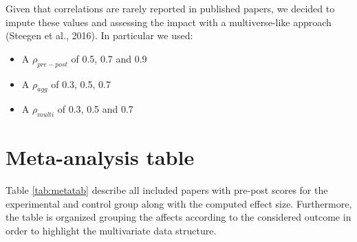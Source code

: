 \documentclass[
]{article}
\providecommand{\tightlist}{%
  \setlength{\itemsep}{0pt}\setlength{\parskip}{0pt}}
\begin{document}
Given that correlations are rarely reported in published papers, we decided to impute these values and assessing the impact with a multiverse-like approach (Steegen et al., 2016). In particular we used:

\begin{itemize}
\tightlist
\item
  A \(\rho_{pre-post}\) of 0.5, 0.7 and 0.9
\item
  A \(\rho_{agg}\) of 0.3, 0.5, 0.7
\item
  A \(\rho_{multi}\) of 0.3, 0.5 and 0.7
\end{itemize}

\hypertarget{meta-analysis-table}{%
\section{Meta-analysis table}\label{meta-analysis-table}}

Table \ref{tab:metatab} describe all included papers with pre-post scores for the experimental and control group along with the computed effect size. Furthermore, the table is organized grouping the affects according to the considered outcome in order to highlight the multivariate data structure.

\providecommand{\docline}[3]{\noalign{\global\setlength{\arrayrulewidth}{#1}}\arrayrulecolor[HTML]{#2}\cline{#3}}

\setlength{\tabcolsep}{2pt}

\renewcommand*{\arraystretch}{1.5}
\end{document}
